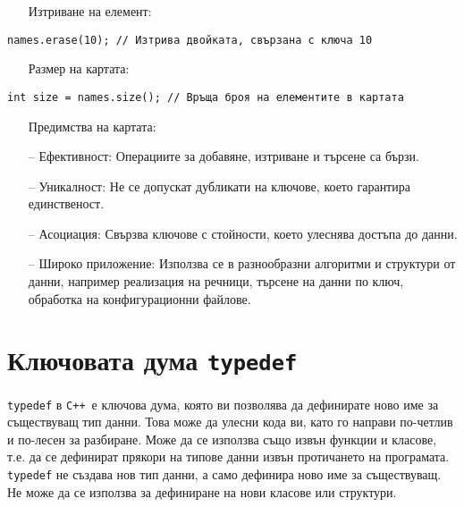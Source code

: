 \documentclass[oneside]{book}
\newcommand*{\code}[1]{\texttt{#1}}
\newcommand*{\cpp}{\texttt{C++}\ }
\begin{document}
\begin{itemize}\item[Изтриване] на елемент:\end{itemize}
\begin{mdframed}\begin{lstlisting}
names.erase(10); // Изтрива двойката, свързана с ключа 10
\end{lstlisting}\end{mdframed}
\pagebreak
\begin{itemize}\item[Размер] на картата:\end{itemize}
\begin{mdframed}\begin{lstlisting}
int size = names.size(); // Връща броя на елементите в картата
\end{lstlisting}\end{mdframed}

\begin{itemize}\item[Предимства] на картата:\end{itemize}
\begin{itemize}
    \item[--] Ефективност: Операциите за добавяне, изтриване и търсене са бързи.
    \item[--] Уникалност: Не се допускат дубликати на ключове, което гарантира единственост.
    \item[--] Асоциация: Свързва ключове с стойности, което улеснява достъпа до данни.
    \item[--] Широко приложение: Използва се в разнообразни алгоритми и структури от данни, например реализация на речници, търсене на данни по ключ, обработка на конфигурационни файлове.
\end{itemize}

\section{Ключовата дума \code{typedef}}
\code{typedef} в \cpp е ключова дума, която ви позволява да дефинирате ново име за съществуващ тип данни. Това може да улесни кода ви, като го направи по-четлив и по-лесен за разбиране. Може да се използва също извън функции и класове, т.е. да се дефинират прякори на типове данни извън протичането на програмата.
\code{typedef} не създава нов тип данни, а само дефинира ново име за съществуващ.
Не може да се използва за дефиниране на нови класове или структури.
\end{document}
